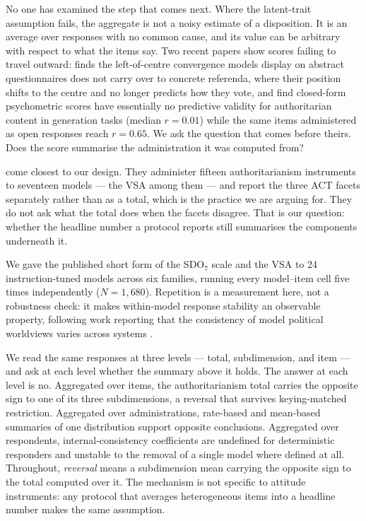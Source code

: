 \documentclass{article}
\begin{document}
No one has examined the step that comes next. Where the latent-trait assumption fails, the aggregate is not a noisy estimate of a disposition. It is an average over responses with no common cause, and its value can be arbitrary with respect to what the items say. Two recent papers show scores failing to travel outward: \citet{barmettler2026} finds the left-of-centre convergence models display on abstract questionnaires does not carry over to concrete referenda, where their position shifts to the centre and no longer predicts how they vote, and \citet{einwiller2026} find closed-form psychometric scores have essentially no predictive validity for authoritarian content in generation tasks (median $r = 0.01$) while the same items administered as open responses reach $r = 0.65$. We ask the question that comes before theirs. Does the score summarise the administration it was computed from?

\citet{einwiller2026} come closest to our design. They administer fifteen authoritarianism instruments to seventeen models --- the VSA among them --- and report the three ACT facets separately rather than as a total, which is the practice we are arguing for. They do not ask what the total does when the facets disagree. That is our question: whether the headline number a protocol reports still summarises the components underneath it.

We gave the published short form of the SDO$_7$ scale \citep{ho2015} and the VSA \citep{bizumic2018} to 24 instruction-tuned models across six families, running every model--item cell five times independently ($N = 1{,}680$). Repetition is a measurement here, not a robustness check: it makes within-model response stability an observable property, following work reporting that the consistency of model political worldviews varies across systems \citep{ceron2024,moore2024}.

We read the same responses at three levels --- total, subdimension, and item --- and ask at each level whether the summary above it holds. The answer at each level is no. Aggregated over items, the authoritarianism total carries the opposite sign to one of its three subdimensions, a reversal that survives keying-matched restriction. Aggregated over administrations, rate-based and mean-based summaries of one distribution support opposite conclusions. Aggregated over respondents, internal-consistency coefficients are undefined for deterministic responders and unstable to the removal of a single model where defined at all. Throughout, \emph{reversal} means a subdimension mean carrying the opposite sign to the total computed over it. The mechanism is not specific to attitude instruments: any protocol that averages heterogeneous items into a headline number makes the same assumption.
\end{document}

